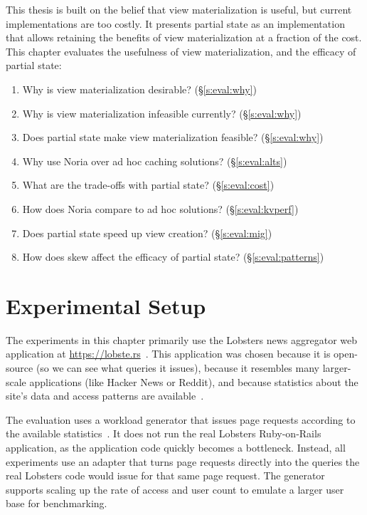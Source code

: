This thesis is built on the belief that view materialization is useful, but
current implementations are too costly. It presents partial state as an
implementation that allows retaining the benefits of view materialization at a
fraction of the cost. This chapter evaluates the usefulness of view
materialization, and the efficacy of partial state:

\begin{enumerate}
  \item Why is view materialization desirable? (\S\ref{s:eval:why})
  \item Why is view materialization infeasible currently? (\S\ref{s:eval:why})
  \item Does partial state make view materialization feasible? (\S\ref{s:eval:why})
  \item Why use Noria over ad hoc caching solutions? (\S\ref{s:eval:alts})
  \item What are the trade-offs with partial state? (\S\ref{s:eval:cost})
  \item How does Noria compare to ad hoc solutions? (\S\ref{s:eval:kvperf})
  \item Does partial state speed up view creation? (\S\ref{s:eval:mig})
  \item How does skew affect the efficacy of partial state? (\S\ref{s:eval:patterns})
\end{enumerate}

\section{Experimental Setup}
\label{s:eval:setup}

The experiments in this chapter primarily use the Lobsters news
aggregator web application at \url{https://lobste.rs}~\cite{lobsters}. This
application was chosen because it is open-source (so we can see what queries it
issues), because it resembles many larger-scale applications (like Hacker News
or Reddit), and because statistics about the site's data and access patterns are
available~\cite{lobsters-data}.

The evaluation uses a workload generator that issues page requests
according to the available statistics~\cite{generator}. It does not run the
real Lobsters Ruby-on-Rails application, as the application code quickly becomes
a bottleneck. Instead, all experiments use an adapter that turns page requests
directly into the queries the real Lobsters code would issue for that same page
request. The generator supports scaling up the rate of access and user count to
emulate a larger user base for benchmarking.

